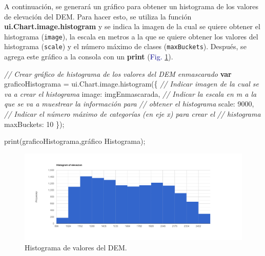 \documentclass[
  12pt,
  letterpaper,
  twoside]{book}
\newenvironment{Shaded}{\begin{snugshade}}{\end{snugshade}}
\newcommand{\AttributeTok}[1]{\textcolor[rgb]{0.48,0.12,0.64}{#1}}
\newcommand{\CommentTok}[1]{\textcolor[rgb]{0.24,0.58,0.00}{\textit{#1}}}
\newcommand{\ControlFlowTok}[1]{\textcolor[rgb]{0.00,0.00,0.00}{\textbf{#1}}}
\newcommand{\DataTypeTok}[1]{\textcolor[rgb]{0.00,0.00,0.00}{#1}}
\newcommand{\DecValTok}[1]{\textcolor[rgb]{0.28,0.53,0.93}{#1}}
\newcommand{\FunctionTok}[1]{\textcolor[rgb]{0.48,0.12,0.64}{#1}}
\newcommand{\KeywordTok}[1]{\textcolor[rgb]{0.48,0.12,0.64}{#1}}
\newcommand{\NormalTok}[1]{#1}
\newcommand{\OperatorTok}[1]{\textcolor[rgb]{0.00,0.00,0.00}{#1}}
\newcommand{\StringTok}[1]{\textcolor[rgb]{0.87,0.29,0.22}{#1}}
\newcommand\boldpurple[1]{\textcolor{darkpurple}{\textbf{#1}}}
\begin{document}
A continuación, se generará un gráfico para obtener un histograma de los valores de elevación del DEM. Para hacer esto, se utiliza la función \boldpurple{ui.Chart.image.histogram} y se indica la imagen de la cual se quiere obtener el histograma (\texttt{image}), la escala en metros a la que se quiere obtener los valores del histograma (\texttt{scale}) y el número máximo de clases (\texttt{maxBuckets}). Después, se agrega este gráfico a la consola con un \boldpurple{print} (\textcolor{darkblue}{Fig.} \ref{fig:f914}).

\begin{Shaded}
\begin{Highlighting}[]
\CommentTok{// Crear gráfico de histograma de los valores del DEM enmascarado}
\ControlFlowTok{var}\NormalTok{ graficoHistograma }\OperatorTok{=} \KeywordTok{ui}\OperatorTok{.}\AttributeTok{Chart}\OperatorTok{.}\AttributeTok{image}\OperatorTok{.}\FunctionTok{histogram}\NormalTok{(\{}
     \CommentTok{// Indicar imagen de la cual se va a crear el histograma  }
  \DataTypeTok{image}\OperatorTok{:}\NormalTok{ imgEnmascarada}\OperatorTok{,}
  \CommentTok{// Indicar la escala en m a la que se va a muestrear la información para  }
  \CommentTok{// obtener el histograma}
  \DataTypeTok{scale}\OperatorTok{:} \DecValTok{9000}\OperatorTok{,}
  \CommentTok{// Indicar el número máximo de categorías (en eje x) para crear el }
  \CommentTok{// histograma}
  \DataTypeTok{maxBuckets}\OperatorTok{:} \DecValTok{10}
\NormalTok{  \})}\OperatorTok{;}

\FunctionTok{print}\NormalTok{(graficoHistograma}\OperatorTok{,}\StringTok{\textquotesingle{}gráfico Histograma\textquotesingle{}}\NormalTok{)}\OperatorTok{;}
\end{Highlighting}
\end{Shaded}

\begin{figure}[H]

{\centering \includegraphics[width=0.95\linewidth]{Img/histElevacion} 

}

\caption{Histograma de valores del DEM.}\label{fig:f914}
\end{figure}
\end{document}
